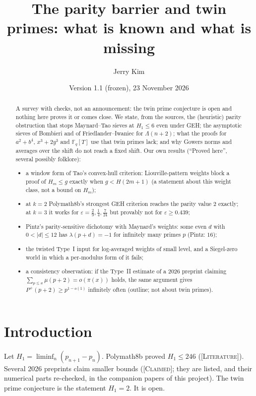 \documentclass[11pt]{amsart}
\title[The parity barrier and twin primes]{The parity barrier and twin primes: what is known and what is missing}
\author{Jerry Kim}
\date{Version 1.1 (frozen), 23 November 2026}
\theoremstyle{definition}
\theoremstyle{remark}
\newcommand{\lbl}[1]{\textup{\textsc{[#1]}}}
\begin{document}
\begin{abstract}
A survey with checks, not an announcement: the twin prime conjecture is
open and nothing here proves it or comes close. We state, from the
sources, the (heuristic) parity obstruction that stops Maynard--Tao sieves
at $H_1\le6$ even under GEH; the asymptotic sieves of Bombieri and of
Friedlander--Iwaniec for $\Lambda(n+2)$; what the proofs for $a^2+b^4$,
$x^3+2y^3$ and $\mathbb F_q[T]$ use that twin primes lack; and why Gowers
norms and averages over the shift do not reach a fixed shift. Our own
results (``Proved here'', several possibly folklore):
\begin{itemize}
\item a window form of Tao's convex-hull criterion: Liouville-pattern weights
  block a proof of $H_m\le g$ exactly when $g<H(2m+1)$ (a statement about
  this weight class, not a bound on $H_m$);
\item at $k=2$ Polymath8b's strongest GEH criterion reaches the parity value
  $2$ exactly; at $k=3$ it works for $\varepsilon=\frac29,\frac14,\frac7{24}$ but
  provably not for $\varepsilon\ge0.439$;
\item Pintz's parity-sensitive dichotomy with Maynard's weights: some even
  $d$ with $0<|d|\le12$ has $\lambda(p+d)=-1$ for infinitely many primes $p$
  (Pintz: $16$);
\item the twisted Type~I input for log-averaged weights of small level, and a
  Siegel-zero world in which a per-modulus form of it fails;
\item a consistency observation: if the Type~II estimate of a 2026 preprint
  claiming $\sum_{p\le x}\mu(p+2)=o(\pi(x))$ holds, the same argument gives
  $P^+(p+2)\ge p^{1-o(1)}$ infinitely often (outline; not about twin primes).
\end{itemize}
\end{abstract}

\maketitle
\setcounter{tocdepth}{1}
\tableofcontents

\section{Introduction}

Let $H_1=\liminf_n (p_{n+1}-p_n)$. Polymath8b proved $H_1\le 246$
\cite[Theorem~1.4(i), p.~2]{PM8b} (\lbl{Literature}). Several 2026 preprints
claim smaller bounds (\lbl{Claimed}; they are listed, and their numerical
parts re-checked, in the companion papers of this project). The twin prime
conjecture is the statement $H_1=2$. It is open.
\end{document}
